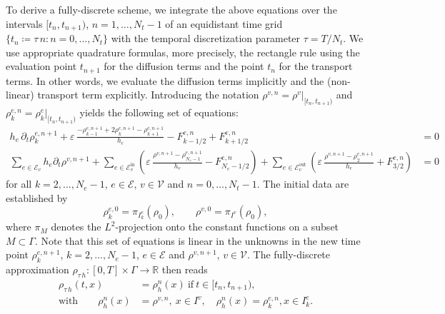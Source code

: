 To derive a fully-discrete scheme, we integrate the above equations over the intervals $[t_n, t_{n+1})$, $n=1, \ldots, N_t-1$ of an equidistant time grid $\{ t_n \coloneqq \tau\,n \colon n = 0, \ldots, N_t \}$ with the temporal discretization parameter $\tau = T / N_t$. We use appropriate quadrature formulas, more precisely, the rectangle rule using the evaluation point $t_{n+1}$ for the diffusion terms and the point $t_n$ for the transport terms. In other words, we evaluate the diffusion terms implicitly and the (non-linear) transport term explicitly. Introducing the notation $\rho^{v,n} = \rho^v|_{[t_n,t_{n+1})}$ and $\rho_k^{e,n} = \rho_k^e|_{[t_n,t_{n+1})}$ yields the following set of equations:
\begin{subequations}
    \label{eq:fully_discrete_fvm}
    \begin{align}
        h_e\,\partial_t \rho_k^{e,n+1} + \varepsilon\,\frac{-\rho_{k-1}^{e,n+1} +
        2\rho_k^{e,n+1} - \rho_{k+1}^{e,n+1}}{h_e} - F_{k-1/2}^{e,n} +
        F_{k+1/2}^{e,n} &= 0 \\	
        \sum_{e\in \mathcal{E}_v} h_e\partial_t\rho^{v,n+1}
        + \sum_{e\in \mathcal{E}_v^{\text{in}}}
        \left(\varepsilon\,\frac{\rho^{v,n+1}-\rho_{N_e-1}^{e,n+1}}{h_e} -
        F^{e,n}_{N_e-1/2}\right)
        + \sum_{e\in \mathcal{E}_v^{\text{out}}}
        \left(\varepsilon\,\frac{\rho^{v,n+1}-\rho_2^{e,n+1}}{h_e} + F^{e,n}_{3/2}\right)
        &= 0
    \end{align}
\end{subequations}
for all $k = 2, \ldots, N_e-1$, $e \in \mathcal{E}$, $v \in \mathcal{V}$ and $n = 0, \ldots, N_t - 1$. The initial data are established by
\begin{equation*}
	\rho_k^{e,0}=\pi_{I_k^e}(\rho_0),\qquad \rho^{v,0} = \pi_{I^v}(\rho_0),
\end{equation*}
where $\pi_M$ denotes the $L^2$-projection onto the constant functions on a subset $M \subset \Gamma$. Note that this set of equations is linear in the unknowns in the new time point $\rho_k^{e,n+1}$, $k = 2, \ldots, N_e-1$, $ e \in \mathcal{E}$ and $\rho^{v,n+1}$, $v \in \mathcal{V}$. The fully-discrete approximation $\rho_{\tau\,h}\colon [0,T]\times \Gamma\to \mathbb{R}$ then reads
\begin{align*}
	\rho_{\tau\,h}(t,x) &= \rho_h^n(x)\ \text{if}\ t\in [t_n,t_{n+1}),\\
	\text{with}\qquad \rho_h^n(x) &= \rho^{v,n},\ x\in I^v,\quad \rho_h^n(x)
	= \rho_k^{e,n}, x\in I_k^e.
\end{align*}
